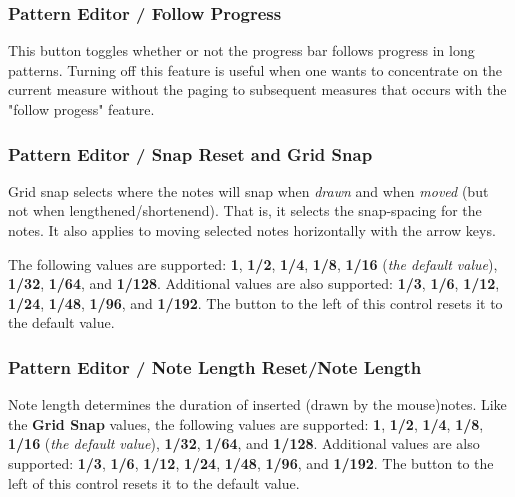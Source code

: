 \subsubsection{Pattern Editor / Follow Progress}
\label{subsubsec:pattern_editor_second_row_follow_progress}

   This button toggles whether or not the progress bar follows
   progress in long patterns.  Turning off this feature is useful when
   one wants to concentrate on the current measure without the paging to
   subsequent measures that occurs with the "follow progess" feature.

\subsubsection{Pattern Editor / Snap Reset and Grid Snap}
\label{subsubsec:pattern_editor_second_row_grid_snap}

   Grid snap selects where the notes will snap when
   \textsl{drawn} and when \textsl{moved} (but not when lengthened/shortenend).
   That is, it selects the snap-spacing for the notes.
   It also applies to moving selected notes horizontally with the
   arrow keys.

   The following values are supported:
   \textbf{1}, \textbf{1/2}, \textbf{1/4}, \textbf{1/8},
   \textbf{1/16} (\textsl{the default value}),
   \textbf{1/32}, \textbf{1/64}, and \textbf{1/128}.
   Additional values are also supported:
   \textbf{1/3}, \textbf{1/6}, \textbf{1/12}, \textbf{1/24},
   \textbf{1/48}, \textbf{1/96}, and \textbf{1/192}.
   The button to the left of this control resets it to the default value.

\subsubsection{Pattern Editor / Note Length Reset/Note Length}
\label{subsubsec:pattern_editor_second_row_note_length}

   Note length determines the duration of inserted (drawn by the mouse)notes.
   Like the \textbf{Grid Snap} values,
   the following values are supported:
   \textbf{1}, \textbf{1/2}, \textbf{1/4}, \textbf{1/8},
   \textbf{1/16} (\textsl{the default value}),
   \textbf{1/32}, \textbf{1/64}, and \textbf{1/128}.
   Additional values are also supported:
   \textbf{1/3}, \textbf{1/6}, \textbf{1/12}, \textbf{1/24},
   \textbf{1/48}, \textbf{1/96}, and \textbf{1/192}.
   The button to the left of this control resets it to the default value.

